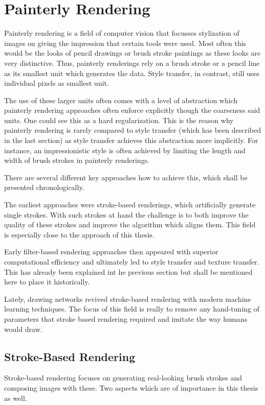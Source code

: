 \section{Painterly Rendering}


Painterly rendering is a field of computer vision that focusses stylization of images on giving the impression that certain tools were used.
Most often this would be the looks of pencil drawings or brush stroke paintings as these looks are very distinctive.
Thus, painterly renderings rely on a brush stroke or a pencil line as its smallest unit which generates the data.
Style transfer, in contrast, still uses individual pixels as smallest unit.

The use of these larger units often comes with a level of abstraction which painterly rendering approaches often enforce explicitly though the coarseness said units.
One could see this as a hard regularization.
This is the reason why painterly rendering is rarely compared to style transfer (which has been described in the last section) as style transfer achieves this abstraction more implicitly.
For instance, an impressionistic style is often achieved by limiting the length and width of brush strokes in painterly renderings.

There are several different key approaches how to achieve this, which shall be presented chronologically.

The earliest approaches were stroke-based renderings, which artificially generate single strokes.
With such strokes at hand the challenge is to both improve the quality of these strokes and improve the algorithm which aligns them.
This field is especially close to the approach of this thesis.

Early filter-based rendering approaches then appeared with superior computational efficiency and ultimately led to style transfer and texture transfer.
This has already been explained int he previous section but shall be mentioned here to place it historically.

Lately, drawing networks revived stroke-based rendering with modern machine learning techniques.
The focus of this field is really to remove any hand-tuning of parameters that stroke based rendering required and imitate the way humans would draw.


\subsection{Stroke-Based Rendering}
Stroke-based rendering focuses on generating real-looking brush strokes and composing images with these.
Two aspects which are of importance in this thesis as well.

